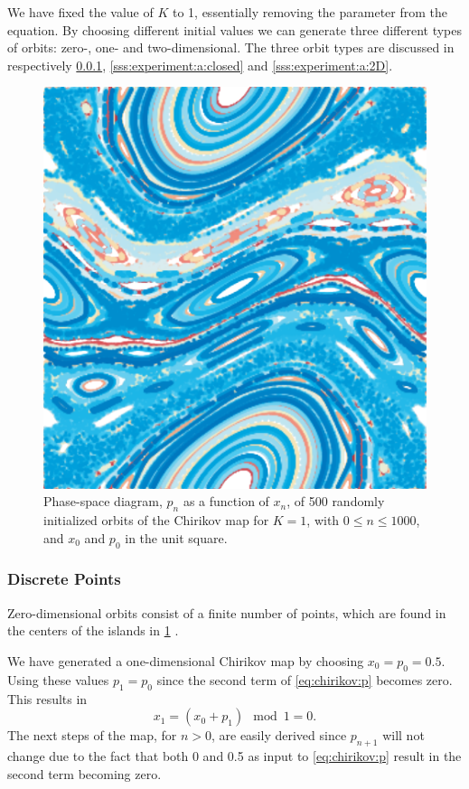 We have fixed the value of $K$ to 1, essentially removing the parameter from the equation. By choosing different initial values we can generate three different types of orbits: zero-, one- and two-dimensional. The three orbit types are discussed in respectively \cref{sss:experiment:a:discrete}, \ref{sss:experiment:a:closed} and \ref{sss:experiment:a:2D}.

 	\begin{figure}
		\centering
		\includegraphics[width=0.9\columnwidth, height=0.2\textheight, keepaspectratio=true]{./img/assignment_a_pretty_low_res.pdf}
		\caption{Phase-space diagram, $p_n$ as a function of $x_n$, of 500 randomly initialized orbits of the Chirikov map for $K = 1$, with $0 \leq n \leq 1000$, and $x_0$ and $p_0$ in the unit square.}
		\label{fig:a:pretty}
	\end{figure}

\subsubsection{Discrete Points}
\label{sss:experiment:a:discrete}
Zero-dimensional orbits consist of a finite number of points, which are found in the centers of the islands in \cref{fig:a:pretty} \cite{kenzel1997physics}. 

We have generated a one-dimensional Chirikov map by choosing $x_0 = p_0 = 0.5$. Using these values $p_1 = p_0$ since the second term of \eqref{eq:chirikov:p} becomes zero. This results in
\begin{equation*}
	x_1 = \left( x_0 + p_{1} \right) \mod 1= 0.	
\end{equation*}
The next steps of the map, for $n > 0$, are easily derived since $p_{n + 1}$ will not change due to the fact that both 0 and 0.5 as input to \eqref{eq:chirikov:p} result in the second term becoming zero. 


